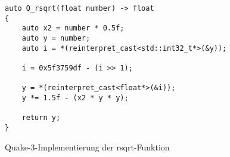\begin{code}
    \begin{verbatim}
auto Q_rsqrt(float number) -> float
{
    auto x2 = number * 0.5f;
    auto y = number;
    auto i = *(reinterpret_cast<std::int32_t*>(&y));

    i = 0x5f3759df - (i >> 1);

    y = *(reinterpret_cast<float*>(&i));
    y *= 1.5f - (x2 * y * y);

    return y;
}
    \end{verbatim}
    \caption{Quake-3-Implementierung der rsqrt-Funktion}
    \label{nvidia:nbody:qrsqrt}
\end{code}
